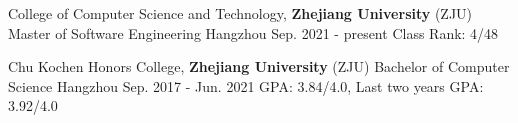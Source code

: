 \begin{cventries}

	\cventry
	{College of Computer Science and Technology, \textbf{Zhejiang University} (ZJU)} %
	{Master of Software Engineering} %
	{Hangzhou} %
	{Sep. 2021 - present} %
	{
		Class Rank: 4/48
	}%
	\vspace{1mm}

	\cventry
	{Chu Kochen Honors College, \textbf{Zhejiang University} (ZJU)} %
	{Bachelor of Computer Science} %
	{Hangzhou} %
	{Sep. 2017 - Jun. 2021} %
	{
		GPA: 3.84/4.0, Last two years GPA: 3.92/4.0
	}%
	\vspace{1mm}
\end{cventries}
